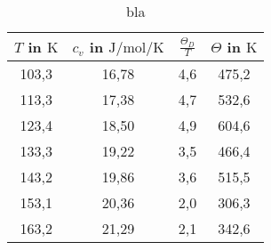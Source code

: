 \begin{table}
    \centering
    \caption{bla}
    \label{tab:bla}
    \begin{tabular}{c c c c}
        \toprule
        $T$ in $\si{\kelvin}$ & $c_v$ in $\si{\joule\per\mole\per\kelvin}$ & $\frac{\Theta_D}{T}$ & $\Theta$ in $\si{\kelvin}$ \\
        \midrule
        103,3  &  16,78  &  4,6  &  475,2  \\
        113,3  &  17,38  &  4,7  &  532,6  \\
        123,4  &  18,50  &  4,9  &  604,6  \\
        133,3  &  19,22  &  3,5  &  466,4  \\
        143,2  &  19,86  &  3,6  &  515,5  \\
        153,1  &  20,36  &  2,0  &  306,3  \\
        163,2  &  21,29  &  2,1  &  342,6  \\
        \bottomrule

    \end{tabular}
\end{table}







%
